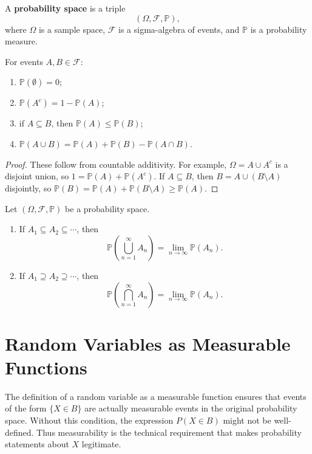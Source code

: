 \begin{definition}
A \textbf{probability space} is a triple
\[
    (\Omega,\mathcal{F},\mathbb{P}),
\]
where $\Omega$ is a sample space, $\mathcal{F}$ is a sigma-algebra of events, and $\mathbb{P}$ is a probability measure.
\end{definition}

\begin{proposition}
For events $A,B\in\mathcal{F}$:
\begin{enumerate}
    \item $\mathbb{P}(\emptyset)=0$;
    \item $\mathbb{P}(A^c)=1-\mathbb{P}(A)$;
    \item if $A\subseteq B$, then $\mathbb{P}(A)\leq\mathbb{P}(B)$;
    \item $\mathbb{P}(A\cup B)=\mathbb{P}(A)+\mathbb{P}(B)-\mathbb{P}(A\cap B)$.
\end{enumerate}
\end{proposition}

\begin{proof}
These follow from countable additivity. For example, $\Omega=A\cup A^c$ is a disjoint union, so $1=\mathbb{P}(A)+\mathbb{P}(A^c)$. If $A\subseteq B$, then $B=A\cup(B\setminus A)$ disjointly, so $\mathbb{P}(B)=\mathbb{P}(A)+\mathbb{P}(B\setminus A)\geq\mathbb{P}(A)$.
\end{proof}

\begin{proposition}
Let $(\Omega,\mathcal{F},\mathbb{P})$ be a probability space.
\begin{enumerate}
    \item If $A_1\subseteq A_2\subseteq\cdots$, then
    \[
        \mathbb{P}\left(\bigcup_{n=1}^{\infty}A_n\right)=\lim_{n\to\infty}\mathbb{P}(A_n).
    \]
    \item If $A_1\supseteq A_2\supseteq\cdots$, then
    \[
        \mathbb{P}\left(\bigcap_{n=1}^{\infty}A_n\right)=\lim_{n\to\infty}\mathbb{P}(A_n).
    \]
\end{enumerate}
\end{proposition}

\section{Random Variables as Measurable Functions}


The definition of a random variable as a measurable function ensures that events of the form $\{X\in B\}$ are actually measurable events in the original probability space. Without this condition, the expression $P(X\in B)$ might not be well-defined. Thus measurability is the technical requirement that makes probability statements about $X$ legitimate.

